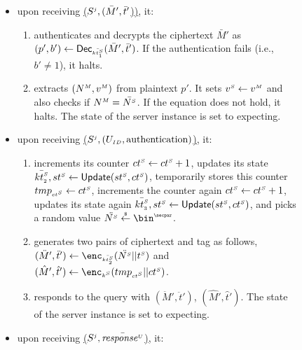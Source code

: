 \begin{figure}[H]
\begin{center}
\begin{tcolorbox}[enhanced,width=4.7in, left=0.1cm,
    drop fuzzy shadow southwest,
    colframe=black,colback=white]
{{\begin{itemize}[leftmargin=.4cm]
\begin{enumerate}
 \item responds to the query with $(\bar M,\bar t)$. The state of the server instance is set to ``expecting''.
 \end{enumerate}
 \item upon receiving  \underline{\send($S^{\scriptscriptstyle j}, (\bar M',  \bar t'$))}, it:
 \begin{enumerate}
 \item authenticates and decrypts the ciphertext $\bar M'$ as $(p', b') \gets \mathsf{Dec}_{\scriptscriptstyle\bar{{kt}^{\scriptscriptstyle S}_{\scriptscriptstyle 1}}}(\bar M', \bar t')$. If the authentication fails (i.e., $b'\neq 1$), it halts. 
\item    extracts $({N}^{\scriptscriptstyle M}, {v}^{\scriptscriptstyle M})$ from plaintext $p'$. It sets ${v}^{\scriptscriptstyle S}\gets{v}^{\scriptscriptstyle M}$ and also  checks if ${N}^{\scriptscriptstyle M}=\bar{{N}^{\scriptscriptstyle S}}$. If the equation does not hold, it halts. The state of the server instance is set to expecting.
 \end{enumerate}
 \item upon receiving  \underline{\send($S^{\scriptscriptstyle j}, (U_{\scriptscriptstyle ID},  \text{authentication})$)}, it:
 \begin{enumerate}
  \item  increments its counter  ${ct}^{\scriptscriptstyle S} \gets {ct}^{\scriptscriptstyle S} + 1$, updates its state  $\bar{{kt}^{\scriptscriptstyle S}_{\scriptscriptstyle 2}}, {st}^{\scriptscriptstyle S} \gets \mathsf{Update}({st}^{\scriptscriptstyle S}, {ct}^{\scriptscriptstyle S})$,  temporarily stores this counter ${tmp}_{\scriptscriptstyle{ct}^{\scriptscriptstyle S}} \gets {ct}^{\scriptscriptstyle S}$, increments the counter again ${ct}^{\scriptscriptstyle S} \gets {ct}^{\scriptscriptstyle S} + 1$, updates its state again $\bar{{kt}^{\scriptscriptstyle S}_{\scriptscriptstyle 3}}, {st}^{\scriptscriptstyle S} \gets \mathsf{Update}({st}^{\scriptscriptstyle S}, {ct}^{\scriptscriptstyle S})$, and picks a random value $\ddot{\VS{\nonce}} \stackrel{\sss\$}\leftarrow \bin^{\sss\secpar}$.
  \item generates two pairs of ciphertext and tag as follows, $(\ddot M', \ddot t')\leftarrow \enc_{\sss\bar{\VS{\keyt_{\sss 2}}}}(\ddot{\VS{\nonce}} || \VS{\trans})$ and  $(\hat M', \hat t')\leftarrow \enc_{\sss\VS{k}}(\tmp_{\sss\VS{\counter}} || \VS{\counter})$. 
  \item responds to the query with $(\ddot M', \ddot t')$, $(\hat M', \hat t')$. The state of the server instance is set to expecting.
 \end{enumerate}
 \item upon receiving  \underline{\send($S^{\scriptscriptstyle j},   \bar{\mathit{response}^{\scriptscriptstyle U}}$)}, it:
 \begin{enumerate}

\end{enumerate}
\end{itemize}}}
\end{tcolorbox}
\end{center}
\end{figure}
